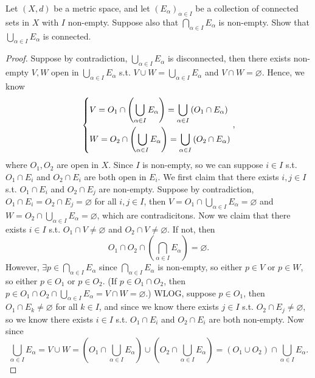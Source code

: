 \begin{problem}[15pts]
    Let $(X,d)$ be a metric space, and let $(E_\alpha)_{\alpha\in I}$ be a collection of connected sets in $X$ with $I$ non-empty.  
Suppose also that $\bigcap_{\alpha\in I} E_\alpha$ is non-empty.  
Show that $\bigcup_{\alpha\in I} E_\alpha$ is connected.
\end{problem}
\begin{proof}
    Suppose by contradiction, \(\bigcup_{\alpha \in I} E_\alpha  \) is disconnected, then there exists non-empty \(V, W\) open in \(\bigcup_{\alpha \in I} E_\alpha  \) s.t. \(V \cup W = \bigcup_{\alpha \in I} E_\alpha  \) and \(V \cap W = \varnothing \). Hence, we know 
    \[
        \begin{dcases}
            V = O_1 \cap \left( \bigcup_{\alpha \in I} E_\alpha   \right) = \bigcup_{\alpha \in I} \left( O_1 \cap E_\alpha  \right) \\
            W = O_2 \cap \left( \bigcup_{\alpha \in I} E_\alpha   \right) = \bigcup_{\alpha \in I} \left( O_2 \cap E_\alpha  \right)  
        \end{dcases},
    \] where \(O_1, O_2\) are open in \(X\). Since \(I\) is non-empty, so we can suppose \(i \in I\) s.t. \(O_1 \cap E_i\) and \(O_2 \cap E_i\) are both open in \(E_i\). We first claim that there exists \(i, j \in I\) s.t. \(O_1 \cap E_i\) and \(O_2 \cap E_j\) are non-empty. Suppose by contradiction, \(O_1 \cap E_i = O_2 \cap E_j = \varnothing \) for all \(i, j \in I\), then \(V = O_1 \cap \bigcup_{\alpha \in I} E_\alpha  = \varnothing  \) and \(W = O_2 \cap \bigcup_{\alpha \in I} E_\alpha = \varnothing  \), which are contradicitons. Now we claim that there exists \(i \in I\) s.t. \(O_1 \cap V \neq \varnothing \) and \(O_2 \cap V \neq \varnothing \). If not, then 
    \[
        O_1 \cap O_2 \cap \left( \bigcap_{\alpha \in I} E_\alpha   \right) = \varnothing. 
    \]
    However, \(\exists p \in \bigcap_{\alpha \in I} E_\alpha \) since \(\bigcap_{\alpha \in I} E_\alpha\) is non-empty, so either \(p \in V\) or \(p \in W\), so either \(p \in O_1\) or \(p \in O_2\). (If \(p \in O_1 \cap O_2\), then \(p \in O_1 \cap O_2 \cap \bigcup_{\alpha \in I} E_\alpha  = V \cap W = \varnothing \).) WLOG, suppose \(p \in O_1\), then \(O_1 \cap E_k \neq \varnothing \) for all \(k \in I\), and since we know there exists \(j \in I\) s.t. \(O_2 \cap E_j \neq \varnothing \), so we know there exists \(i \in I\) s.t. \(O_1 \cap E_i\) and \(O_2 \cap E_i\) are both non-empty.           
    Now since 
    \[
        \bigcup_{\alpha \in I} E_\alpha = V \cup W = \left( O_1 \cap \bigcup_{\alpha \in I} E_\alpha \right) \cup \left( O_2 \cap \bigcup_{\alpha \in I} E_\alpha \right) = (O_1 \cup O_2) \cap \bigcup_{\alpha \in I} E_\alpha.  
\]
\end{proof}
